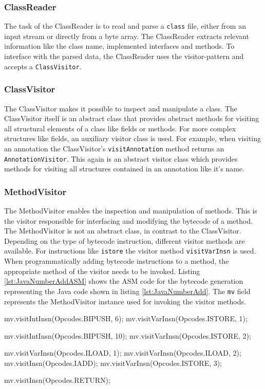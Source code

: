 \subsubsection{ClassReader}

The task of the ClassReader is to read and parse a \texttt{class} file, either from an input stream or directly from a byte array. The ClassReader extracts relevant information like the class name, implemented interfaces and methods. To interface with the parsed data, the ClassReader uses the visitor-pattern and accepts a \texttt{ClassVisitor}. 

\subsubsection{ClassVisitor}

The ClassVisitor makes it possible to inspect and manipulate a class. The ClassVisitor itself is an abstract class that provides abstract methods for visiting all structural elements of a class like fields or methods. For more complex structures like fields, an auxiliary visitor class is used. For example, when visiting an annotation the ClassVisitor's \texttt{visitAnnotation} method returns an \texttt{AnnotationVisitor}. This again is an abstract visitor class which provides methods for visiting all structures contained in an annotation like it's name. 

\subsubsection{MethodVisitor}

The MethodVisitor enables the inspection and manipulation of methods. This is the visitor responsible for interfacing and modifying the bytecode of a method. The MethodVisitor is not an abstract class, in contrast to the ClassVisitor. Depending on the type of bytecode instruction, different visitor methods are available. For instructions like \texttt{istore} the visitor method \texttt{visitVarInsn} is used. When programmatically adding bytecode instructions to a method, the appropriate method of the visitor needs to be invoked. Listing \ref{lst:JavaNumberAddASM} shows the ASM code for the bytecode generation representing the Java code shown in listing \ref{lst:JavaNumberAdd}. The \texttt{mv} field represents the MethodVisitor instance used for invoking the visitor methods.

\begin{JavaCode}[float,numbers=none,caption=ASM code for bytecode generation of the Java program shown in listing \ref{lst:JavaNumberAdd}., label=lst:JavaNumberAddASM]
mv.visitIntInsn(Opcodes.BIPUSH, 6);
mv.visitVarInsn(Opcodes.ISTORE, 1); 

mv.visitIntInsn(Opcodes.BIPUSH, 10);
mv.visitVarInsn(Opcodes.ISTORE, 2); 


mv.visitVarInsn(Opcodes.ILOAD, 1); 
mv.visitVarInsn(Opcodes.ILOAD, 2); 
mv.visitInsn(Opcodes.IADD);        
mv.visitVarInsn(Opcodes.ISTORE, 3);

mv.visitInsn(Opcodes.RETURN);
\end{JavaCode}


